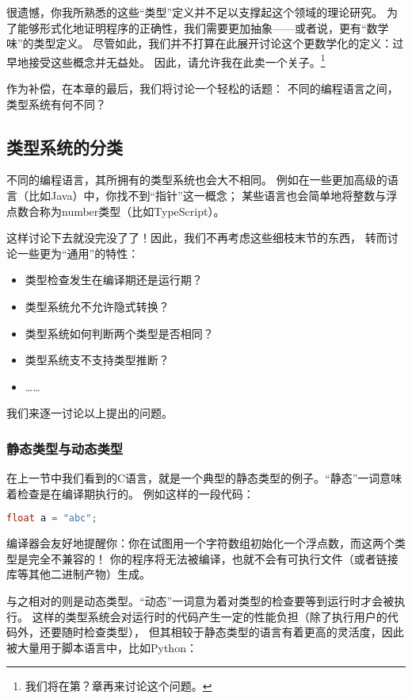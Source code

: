 \documentclass[../main.tex]{subfiles}
\begin{document}
  \indent 很遗憾，你我所熟悉的这些“类型”定义并不足以支撑起这个领域的理论研究。
  为了能够形式化地证明程序的正确性，我们需要更加抽象——或者说，更有“数学味”的类型定义。
  尽管如此，我们并不打算在此展开讨论这个更数学化的定义：过早地接受这些概念并无益处。
  因此，请允许我在此卖一个关子。\footnote[1]{我们将在第？章再来讨论这个问题。}
  
  \indent 作为补偿，在本章的最后，我们将讨论一个轻松的话题：
  不同的编程语言之间，类型系统有何不同？

  \subsection{类型系统的分类}
  \indent 不同的编程语言，其所拥有的类型系统也会大不相同。
  例如在一些更加高级的语言（比如Java）中，你找不到“指针”这一概念；
  某些语言也会简单地将整数与浮点数合称为number类型（比如TypeScript）。

  \indent 这样讨论下去就没完没了了！因此，我们不再考虑这些细枝末节的东西，
  转而讨论一些更为“通用”的特性：

  \begin{itemize}
    \item 类型检查发生在编译期还是运行期？
    \item 类型系统允不允许隐式转换？
    \item 类型系统如何判断两个类型是否相同？
    \item 类型系统支不支持类型推断？
    \item ……
  \end{itemize}

  \indent 我们来逐一讨论以上提出的问题。

  \subsubsection*{静态类型与动态类型}
  \indent 在上一节中我们看到的C语言，就是一个典型的静态类型的例子。“静态”一词意味着检查是在编译期执行的。
  例如这样的一段代码：

\begin{lstlisting}[language=c]
float a = "abc";
\end{lstlisting}

  \indent 编译器会友好地提醒你：你在试图用一个字符数组初始化一个浮点数，而这两个类型是完全不兼容的！
  你的程序将无法被编译，也就不会有可执行文件（或者链接库等其他二进制产物）生成。

  \indent 与之相对的则是动态类型。“动态”一词意为着对类型的检查要等到运行时才会被执行。
  这样的类型系统会对运行时的代码产生一定的性能负担（除了执行用户的代码外，还要随时检查类型），
  但其相较于静态类型的语言有着更高的灵活度，因此被大量用于脚本语言中，比如Python：
\end{document}
